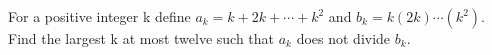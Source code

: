 For a positive integer k define $a_k=k+2k+\cdots+k^2$ and $b_k=k(2k)\cdots(k^2)$. Find the largest k at most twelve such that $a_k$ does not divide $b_k$.
